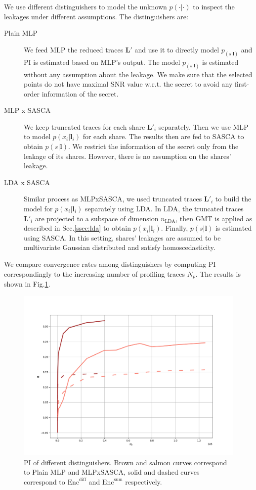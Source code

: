 \documentclass{llncs}
\begin{document}
	We use different distinguishers to model the unknown $p(\cdot|\cdot)$ to inspect the leakages under different assumptions. 
	The distinguishers are:
	\begin{description}
		\item[Plain MLP] We feed MLP the reduced traces $\bm{L}'$ and use it to directly model $p_(s|\bm{l})$ and PI is estimated based on MLP's output. The model $p_(s|\bm{l})$ is estimated without any assumption about the leakage. We make sure that the selected points do not have maximal SNR value w.r.t. the secret to avoid any first-order information of the secret.
		\item[MLP x SASCA] We keep truncated traces for each share $\bm{L}'_i$ separately. Then we use MLP to model $p(x_i|\bm{l}_i)$ for each share. The results then are fed to SASCA to obtain $p(s|\bm{l})$. We restrict the information of the secret only from the leakage of its shares. However, there is no assumption on the shares' leakage.
		\item[LDA x SASCA] Similar process as MLPxSASCA, we used truncated traces $\bm{L}'_i$  to build the model for $p(x_i|\bm{l}_i)$ separately using LDA. In LDA, the truncated traces  $\bm{L}'_i$  are projected to a subspace of dimension $n_{\text{LDA}}$, then GMT is applied as described in Sec.\ref{ssec:lda} to obtain  $p(x_i|\bm{l}_i)$. Finally, $p(s|\bm{l})$ is estimated using SASCA. In this setting, shares' leakages are assumed to be multivariate Gaussian distributed and satisfy homoscedasticity.
	\end{description}
	We compare convergence rates among distinguishers by computing PI correspondingly to the increasing number of profiling traces $N_p$. The results is shown in Fig.\ref{fig:pi}.
	\begin{figure}[h]
		\vspace*{-0.0cm}
		\hspace*{0.0cm}\centering \includegraphics[scale=0.3]{figures/pi_mlps.png}
		\vspace*{0.3cm}
		\caption{PI of different distinguishers. Brown and salmon curves correspond to Plain MLP and MLPxSASCA, solid and dashed curves correspond to $\text{Enc}^{\text{diff}}$ and $\text{Enc}^{\text{sum}}$  respectively.}
		\label{fig:pi}
	\end{figure}
\end{document}
